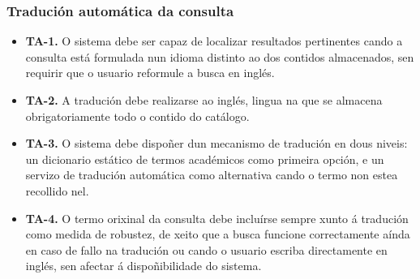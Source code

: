 \documentclass[%
    a4paper,               %
    twoside,               %
    10pt,                  %
]{article}                 %
\begin{document}
\subsubsection{Tradución automática da consulta}
\label{req:sec:traduccion}
\begin{itemize}
    \item \label{req:ta1}\textbf{TA-1.} O sistema debe ser capaz de localizar resultados pertinentes cando a consulta está formulada nun idioma distinto ao dos contidos almacenados, sen requirir que o usuario reformule a busca en inglés.

    \item \label{req:ta2}\textbf{TA-2.} A tradución debe realizarse ao inglés, lingua na que se almacena obrigatoriamente todo o contido do catálogo.

    \item \label{req:ta3}\textbf{TA-3.} O sistema debe dispoñer dun mecanismo de tradución en dous niveis: un dicionario estático de termos académicos como primeira opción, e un servizo de tradución automática como alternativa cando o termo non estea recollido nel.

    \item \label{req:ta4}\textbf{TA-4.} O termo orixinal da consulta debe incluírse sempre xunto á tradución como medida de robustez, de xeito que a busca funcione correctamente aínda en caso de fallo na tradución ou cando o usuario escriba directamente en inglés, sen afectar á dispoñibilidade do sistema.
\end{itemize}

\end{document}
